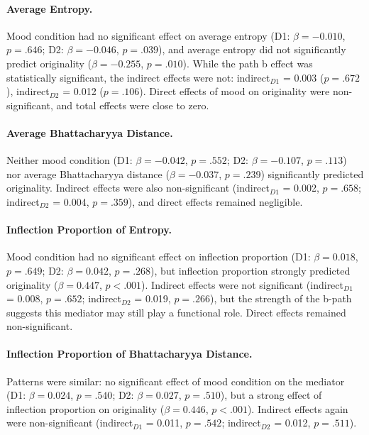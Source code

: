 \documentclass[../MA_Thesis.tex]{subfiles}
\begin{document}
\paragraph{Average Entropy.}
Mood condition had no significant effect on average entropy (D1: $\beta = -0.010$, $p = .646$; D2: $\beta = -0.046$, $p = .039$), and average entropy did not significantly predict originality ($\beta = -0.255$, $p = .010$). While the path b effect was statistically significant, the indirect effects were not: indirect$_{D1}$ = 0.003 ($p = .672$), indirect$_{D2}$ = 0.012 ($p = .106$). Direct effects of mood on originality were non-significant, and total effects were close to zero.

\paragraph{Average Bhattacharyya Distance.}
Neither mood condition (D1: $\beta = -0.042$, $p = .552$; D2: $\beta = -0.107$, $p = .113$) nor average Bhattacharyya distance ($\beta = -0.037$, $p = .239$) significantly predicted originality. Indirect effects were also non-significant (indirect$_{D1}$ = 0.002, $p = .658$; indirect$_{D2}$ = 0.004, $p = .359$), and direct effects remained negligible.

\paragraph{Inflection Proportion of Entropy.}
Mood condition had no significant effect on inflection proportion (D1: $\beta = 0.018$, $p = .649$; D2: $\beta = 0.042$, $p = .268$), but inflection proportion strongly predicted originality ($\beta = 0.447$, $p < .001$). Indirect effects were not significant (indirect$_{D1}$ = 0.008, $p = .652$; indirect$_{D2}$ = 0.019, $p = .266$), but the strength of the b-path suggests this mediator may still play a functional role. Direct effects remained non-significant.

\paragraph{Inflection Proportion of Bhattacharyya Distance.}
Patterns were similar: no significant effect of mood condition on the mediator (D1: $\beta = 0.024$, $p = .540$; D2: $\beta = 0.027$, $p = .510$), but a strong effect of inflection proportion on originality ($\beta = 0.446$, $p < .001$). Indirect effects again were non-significant (indirect$_{D1}$ = 0.011, $p = .542$; indirect$_{D2}$ = 0.012, $p = .511$).
\end{document}
